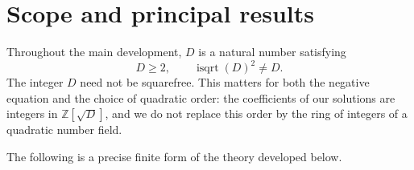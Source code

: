 \documentclass[11pt,letterpaper]{article}
\theoremstyle{definition}
\newcommand{\Z}{\mathbb Z}
\newcommand{\isqrt}{\operatorname{isqrt}}
\begin{document}
\tableofcontents
\newpage

\section{Scope and principal results}\label{sec:scope}

Throughout the main development, $D$ is a natural number satisfying
\begin{equation}\label{eq:guard}
 D\ge2,\qquad \isqrt(D)^2\ne D.
\end{equation}
The integer $D$ need not be squarefree. This matters for both the negative
equation and the choice of quadratic order: the coefficients of our solutions
are integers in $\Z[\sqrt D]$, and we do not replace this order by the ring of
integers of a quadratic number field.

The following is a precise finite form of the theory developed below.
\end{document}
